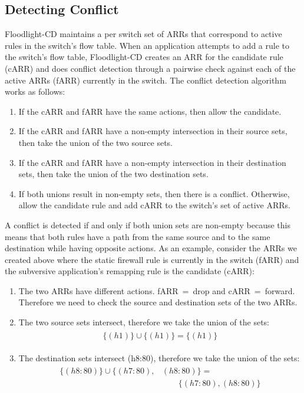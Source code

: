 \subsection{Detecting Conflict}
\label{subsec:conflict}
Floodlight-CD maintains a per switch set of ARRs that correspond to active rules in the switch's flow table.
When an application attempts to add a rule to the switch's flow table, Floodlight-CD creates an ARR for the candidate rule (cARR) and does conflict detection through a pairwise check against each of the active ARRs (fARR) currently in the switch. 
The conflict detection algorithm works as follows:
\begin{enumerate}
\item If the cARR and fARR have the same actions, then allow the candidate.
\item If the cARR and fARR have a non-empty intersection in their source sets, then take the union of the two source sets.
\item If the cARR and fARR have a non-empty intersection in their destination sets, then take the union of the two destination sets.
\item If both unions result in non-empty sets, then there is a conflict. Otherwise, allow the candidate rule and add cARR to the switch's set of active ARRs.
\end{enumerate} 

A conflict is detected if and only if both union sets are non-empty because this means that both rules have a path from the same source and to the same destination while having opposite actions.
As an example, consider the ARRs we created above where the static firewall rule is currently in the switch (fARR) and the subversive application's remapping rule is the candidate (cARR):

\begin{enumerate}
\item The two ARRs have different actions. \mbox{fARR = drop} and \mbox{cARR = forward}. Therefore we need to check the source and destination sets of the two ARRs.
\item The two source sets intersect, therefore we take the union of the sets:
\begin{align}
\begin{aligned}
\{(h1)\} \cup \{(h1)\} = \{(h1)\} \nonumber
\end{aligned}
\end{align}
\item The destination sets intersect (h8:80), therefore we take the union of the sets:
\begin{align}
\begin{aligned}
\{(h8:80)\} \cup \{(h7:80),&(h8:80)\} = \\
        & \qquad \{(h7:80),(h8:80)\} \nonumber
\end{aligned}
\end{align}
\end{enumerate} 

